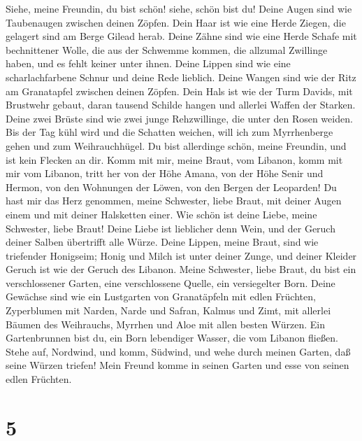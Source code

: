  Siehe, meine Freundin, du bist schön! siehe, schön bist du!
Deine Augen sind wie Taubenaugen zwischen deinen Zöpfen. Dein Haar ist
wie eine Herde Ziegen, die gelagert sind am Berge Gilead herab.
 Deine Zähne sind wie eine Herde Schafe mit bechnittener
Wolle, die aus der Schwemme kommen, die allzumal Zwillinge haben, und es
fehlt keiner unter ihnen.  Deine Lippen sind wie eine
scharlachfarbene Schnur und deine Rede lieblich. Deine Wangen sind wie
der Ritz am Granatapfel zwischen deinen Zöpfen.  Dein Hals
ist wie der Turm Davids, mit Brustwehr gebaut, daran tausend Schilde
hangen und allerlei Waffen der Starken.  Deine zwei Brüste
sind wie zwei junge Rehzwillinge, die unter den Rosen weiden.
 Bis der Tag kühl wird und die Schatten weichen, will ich
zum Myrrhenberge gehen und zum Weihrauchhügel.  Du bist
allerdinge schön, meine Freundin, und ist kein Flecken an dir.
 Komm mit mir, meine Braut, vom Libanon, komm mit mir vom
Libanon, tritt her von der Höhe Amana, von der Höhe Senir und Hermon,
von den Wohnungen der Löwen, von den Bergen der Leoparden! 
Du hast mir das Herz genommen, meine Schwester, liebe Braut, mit deiner
Augen einem und mit deiner Halsketten einer.  Wie schön ist
deine Liebe, meine Schwester, liebe Braut! Deine Liebe ist lieblicher
denn Wein, und der Geruch deiner Salben übertrifft alle Würze.
 Deine Lippen, meine Braut, sind wie triefender Honigseim;
Honig und Milch ist unter deiner Zunge, und deiner Kleider Geruch ist
wie der Geruch des Libanon.  Meine Schwester, liebe Braut,
du bist ein verschlossener Garten, eine verschlossene Quelle, ein
versiegelter Born.  Deine Gewächse sind wie ein Lustgarten
von Granatäpfeln mit edlen Früchten, Zyperblumen mit Narden,
 Narde und Safran, Kalmus und Zimt, mit allerlei Bäumen des
Weihrauchs, Myrrhen und Aloe mit allen besten Würzen.  Ein
Gartenbrunnen bist du, ein Born lebendiger Wasser, die vom Libanon
fließen.  Stehe auf, Nordwind, und komm, Südwind, und wehe
durch meinen Garten, daß seine Würzen triefen! Mein Freund komme in
seinen Garten und esse von seinen edlen Früchten.

\hypertarget{section-4}{%
\section{5}\label{section-4}}

